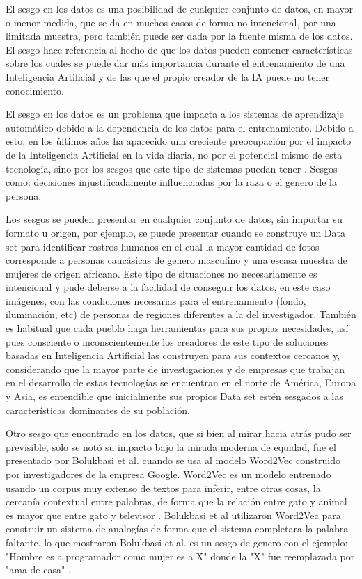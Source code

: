         El sesgo en los datos es una posibilidad de cualquier conjunto de datos, en mayor o menor medida, que se da en muchos casos de forma no intencional, por una limitada muestra, pero también puede ser dada por la fuente misma de los datos. El sesgo hace referencia al hecho de que los datos pueden contener características sobre los cuales se puede dar más importancia durante el entrenamiento de una Inteligencia Artificial y de las que el propio creador de la IA puede no tener conocimiento.
        
        El sesgo en los datos es un problema que impacta a los sistemas de aprendizaje automático debido a la dependencia de los datos para el entrenamiento. Debido a esto, en los últimos años ha aparecido una creciente preocupación por el impacto de la Inteligencia Artificial en la vida diaria, no por el potencial mismo de esta tecnología, sino por los sesgos que este tipo de sistemas puedan tener \cite{Buolamwini2018Sesgo}. Sesgos como: decisiones injustificadamente influenciadas por la raza o el genero de la persona.
        
        Los sesgos se pueden presentar en cualquier conjunto de datos, sin importar su formato u origen, por ejemplo, se puede presentar cuando se construye un Data set para identificar rostros humanos en el cual la mayor cantidad de fotos corresponde a personas caucásicas de genero masculino y una escasa muestra de mujeres de origen africano. Este tipo de situaciones no necesariamente es intencional y pude deberse a la facilidad de conseguir los datos, en este caso imágenes, con las condiciones necesarias para el entrenamiento (fondo, iluminación, etc) de personas de regiones diferentes a la del investigador. También es habitual que cada pueblo haga herramientas para sus propias necesidades, así pues consciente o inconscientemente los creadores de este tipo de soluciones basadas en Inteligencia Artificial las construyen para sus contextos cercanos y, considerando que la mayor parte de investigaciones  y de empresas que trabajan en el desarrollo de estas tecnologías se encuentran en el norte de América, Europa y Asia, es entendible que inicialmente sus propios Data set estén sesgados a las características dominantes de su población.
        
        Otro sesgo que encontrado en los datos, que si bien al mirar hacia atrás pudo ser previsible, solo se notó su impacto bajo la mirada moderna de equidad, fue el presentado por Bolukbasi et al. \cite{Bolukbasi2016Sesgo} cuando se usa al modelo Word2Vec construido por investigadores de la empresa Google. Word2Vec es un modelo entrenado usando un corpus muy extenso de textos para inferir, entre otras cosas, la cercanía contextual entre palabras, de forma que la relación entre gato y animal es mayor que entre gato y televisor \cite{Mikolov2013Word2Vec}. Bolukbasi et al utilizaron Word2Vec para construir un sistema de analogías de forma que el sistema completara la palabra faltante, lo que mostraron Bolukbasi et al. es un sesgo de genero con el ejemplo: "Hombre es a programador como mujer es a X" donde la "X" fue reemplazada por "ama de casa" \cite{Bolukbasi2016Sesgo}. 
        
